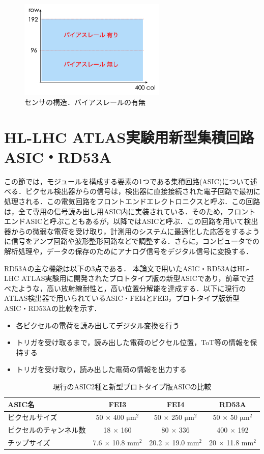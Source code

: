 \begin{figure}[h]
  \centering
  \includegraphics[width=7cm]{./figure/sensor.png}
  \caption{センサの構造．バイアスレールの有無}
  \label{fig:sensor}
\end{figure}


\section{HL-LHC ATLAS実験用新型集積回路ASIC・RD53A}
\label{sec:rd53a}
この節では，モジュールを構成する要素の1つである集積回路(ASIC)について述べる．ピクセル検出器からの信号は，検出器に直接接続された電子回路で最初に処理される．この電気回路をフロントエンドエレクトロニクスと呼ぶ．この回路は，全て専用の信号読み出し用ASIC内に実装されている．そのため，フロントエンドASICと呼ぶこともあるが，以降ではASICと呼ぶ．この回路を用いて検出器からの微弱な電荷を受け取り，計測用のシステムに最適化した応答をするように信号をアンプ回路や波形整形回路などで調整する．さらに，コンピュータでの解析処理や，データの保存のためにアナログ信号をデジタル信号に変換する．\par
RD53Aの主な機能は以下の3点である．
本論文で用いたASIC・RD53AはHL-LHC ATLAS実験用に開発されたプロトタイプ版の新型ASICであり，前章で述べたような，高い放射線耐性と，高い位置分解能を達成する．以下に現行のATLAS検出器で用いられているASIC・FEI4とFEI3，プロトタイプ版新型ASIC・RD53Aの比較を示す．
\begin{itemize}
  \item 各ピクセルの電荷を読み出してデジタル変換を行う\\
  \item トリガを受け取るまで，読み出した電荷のピクセル位置，ToT等の情報を保持する\\
  \item トリガを受け取り，読み出した電荷の情報を出力する
\end{itemize}

\begin{table}[h]
  \centering
  \caption{現行のASIC2種と新型プロトタイプ版ASICの比較}
  \begin{tabular} {|l|cc|c|} \hline
    ASIC名 & FEI3 & FEI4 & RD53A \\ \hline \hline
    ピクセルサイズ & 50 $\times$ 400 $\mathrm{\mu m^2}$ & 50 $\times$ 250 $\mathrm{\mu m^2}$ & 50 $\times$ 50 $\mathrm{\mu m^2}$ \\
    ピクセルのチャンネル数 & 18 $\times$ 160 & 80 $\times$ 336 & 400 $\times$ 192  \\ 
    チップサイズ & 7.6 $\times$ 10.8 $\mathrm{mm^2}$ & 20.2 $\times$ 19.0 $\mathrm{mm^2}$ & 20 $\times$ 11.8 $\mathrm{mm^2}$\\ \hline
  \end{tabular}
  \label{tab:ASIC}
\end{table}


